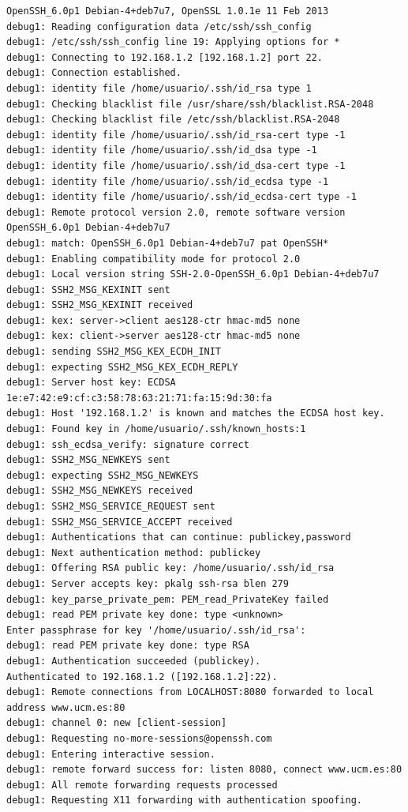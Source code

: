 \documentclass[11pt]{article}
\begin{document}
\begin{lstlisting}
OpenSSH_6.0p1 Debian-4+deb7u7, OpenSSL 1.0.1e 11 Feb 2013
debug1: Reading configuration data /etc/ssh/ssh_config
debug1: /etc/ssh/ssh_config line 19: Applying options for *
debug1: Connecting to 192.168.1.2 [192.168.1.2] port 22.
debug1: Connection established.
debug1: identity file /home/usuario/.ssh/id_rsa type 1
debug1: Checking blacklist file /usr/share/ssh/blacklist.RSA-2048
debug1: Checking blacklist file /etc/ssh/blacklist.RSA-2048
debug1: identity file /home/usuario/.ssh/id_rsa-cert type -1
debug1: identity file /home/usuario/.ssh/id_dsa type -1
debug1: identity file /home/usuario/.ssh/id_dsa-cert type -1
debug1: identity file /home/usuario/.ssh/id_ecdsa type -1
debug1: identity file /home/usuario/.ssh/id_ecdsa-cert type -1
debug1: Remote protocol version 2.0, remote software version OpenSSH_6.0p1 Debian-4+deb7u7
debug1: match: OpenSSH_6.0p1 Debian-4+deb7u7 pat OpenSSH*
debug1: Enabling compatibility mode for protocol 2.0
debug1: Local version string SSH-2.0-OpenSSH_6.0p1 Debian-4+deb7u7
debug1: SSH2_MSG_KEXINIT sent
debug1: SSH2_MSG_KEXINIT received
debug1: kex: server->client aes128-ctr hmac-md5 none
debug1: kex: client->server aes128-ctr hmac-md5 none
debug1: sending SSH2_MSG_KEX_ECDH_INIT
debug1: expecting SSH2_MSG_KEX_ECDH_REPLY
debug1: Server host key: ECDSA 1e:e7:42:e9:cf:c3:58:78:63:21:71:fa:15:9d:30:fa
debug1: Host '192.168.1.2' is known and matches the ECDSA host key.
debug1: Found key in /home/usuario/.ssh/known_hosts:1
debug1: ssh_ecdsa_verify: signature correct
debug1: SSH2_MSG_NEWKEYS sent
debug1: expecting SSH2_MSG_NEWKEYS
debug1: SSH2_MSG_NEWKEYS received
debug1: SSH2_MSG_SERVICE_REQUEST sent
debug1: SSH2_MSG_SERVICE_ACCEPT received
debug1: Authentications that can continue: publickey,password
debug1: Next authentication method: publickey
debug1: Offering RSA public key: /home/usuario/.ssh/id_rsa
debug1: Server accepts key: pkalg ssh-rsa blen 279
debug1: key_parse_private_pem: PEM_read_PrivateKey failed
debug1: read PEM private key done: type <unknown>
Enter passphrase for key '/home/usuario/.ssh/id_rsa': 
debug1: read PEM private key done: type RSA
debug1: Authentication succeeded (publickey).
Authenticated to 192.168.1.2 ([192.168.1.2]:22).
debug1: Remote connections from LOCALHOST:8080 forwarded to local address www.ucm.es:80
debug1: channel 0: new [client-session]
debug1: Requesting no-more-sessions@openssh.com
debug1: Entering interactive session.
debug1: remote forward success for: listen 8080, connect www.ucm.es:80
debug1: All remote forwarding requests processed
debug1: Requesting X11 forwarding with authentication spoofing.

\end{lstlisting}
\end{document}
